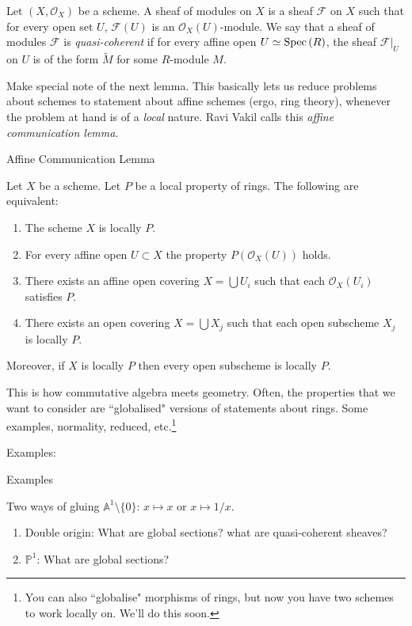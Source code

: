 \documentclass[ignorenonframetext,t]{beamer}
\newcommand{\Spec}{{\rm Spec \,}}
\renewcommand{\tilde}{\widetilde}
\newcommand{\A}{{\mathbb A}}
\renewcommand{\P}{{\mathbb P}}
\theoremstyle{definition}
\begin{document}
\begin{frame}
\begin{definition}
	Let $(X,\mathcal{O}_X)$ be a scheme. A sheaf of modules on $X$ is a sheaf $\mathcal{F}$ on $X$ such that for every open set $U$, $\mathcal{F}(U)$ is an $\mathcal{O}_X(U)$-module. We say that a sheaf of modules $\mathcal{F}$ is \textit{quasi-coherent} if for every affine open $U\simeq \Spec(R)$, the sheaf $\mathcal{F}|_U$ on $U$ is of the form $\tilde{M}$ for some $R$-module $M$.
\end{definition}

\end{frame}


Make special note of the next lemma. This basically lets us reduce problems about schemes to statement about affine schemes (ergo, ring theory), whenever the problem at hand is of a \textit{local} nature. Ravi Vakil calls this \textit{affine communication lemma}.

\begin{frame}{Affine Communication Lemma}

\begin{lemma}
	\label{lemma-locally-P}
	Let $X$ be a scheme. Let $P$ be a local property of rings.
	The following are equivalent:
	\begin{enumerate}
		\item The scheme $X$ is locally $P$.
		\item For every affine open $U \subset X$ the property
		$P(\mathcal{O}_X(U))$ holds.
		\item There exists an affine open covering $X = \bigcup U_i$ such that
		each $\mathcal{O}_X(U_i)$ satisfies $P$.
		\item There exists an open covering $X = \bigcup X_j$
		such that each open subscheme $X_j$ is locally $P$.
	\end{enumerate}
	Moreover, if $X$ is locally $P$ then every open subscheme
	is locally $P$.
\end{lemma}
\end{frame}

This is how commutative algebra meets geometry. Often, the properties that we want to consider are ``globalised" versions of statements about rings. Some examples, normality, reduced, etc.\footnote{You can also ``globalise" morphisms of rings, but now you have two schemes to work locally on. We'll do this soon.}



Examples:

\begin{frame}{Examples}

Two ways of gluing $\A^1\setminus\lbrace 0\rbrace$: $x\mapsto x$ or $x\mapsto 1/x$.
	\begin{enumerate}
		\item Double origin: What are global sections? what are quasi-coherent sheaves?
		\item $\P^1$: What are global sections?
	\end{enumerate}
\end{frame}
\end{document}
